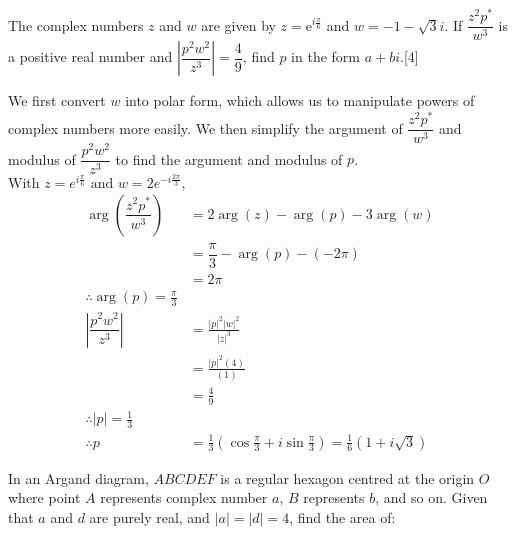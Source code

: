 \documentclass[12pt, a4 paper]{article}
\begin{document}
\begin{outline}[enumerate]
	\1 The complex numbers $z$ and $w$ are given by $z=\mathrm{e}^{i\frac{\pi}{6}}$ and $w=-1-\sqrt{3}i$. If $\dfrac{z^2p^*}{w^3}$ is a positive real number and $\left|\dfrac{p^2w^2}{z^3}\right|=\dfrac{4}{9}$, find $p$ in the form $a+bi$.\hfill[4] %
	\begin{answer}
		We first convert $w$ into polar form, which allows us to manipulate powers of complex numbers more easily. We then simplify the argument of $\dfrac{z^2p^*}{w^3}$ and modulus of $\dfrac{p^2w^2}{z^3}$ to find the argument and modulus of $p$.\\$\textrm{With }z=e^{i\frac{\pi}{6}} \textrm{ and } w=2e^{-i\frac{2\pi}{3}},$
		\begin{align*}
			\arg{(\dfrac{z^2p^*}{w^3})}      & =2\arg{(z)}-\arg{(p)}-3\arg{(w)}                                                
			\\
			                                 & = \dfrac{\pi}{3}-\arg{(p)}-(-2\pi)                                              \\&=2\pi\\
			\therefore \arg{(p)} = \frac{\pi}{3}\\
			\left|\dfrac{p^2w^2}{z^3}\right| & = \frac{|p|^2|w|^2}{|z|^3}                                                      \\
			                                 & = \frac{|p|^2(4)}{(1)}                                                          \\
			                                 & = \frac{4}{9}                                                                   \\
			\therefore |p|=\frac{1}{3}\\
			\therefore p                     & =\frac{1}{3}(\cos{\frac{\pi}{3}}+i\sin{\frac{\pi}{3}})=\frac{1}{6}(1+i\sqrt{3}) 
		\end{align*}
	\end{answer}
		    
		   
	\1 In an Argand diagram, $ABCDEF$ is a regular hexagon centred at the origin $O$ where point $A$ represents complex number $a$, $B$ represents $b$, and so on. Given that $a$ and $d$ are purely real, and $|a|=|d|=4$, find the area of: %
		    

\end{outline}
\end{document}
